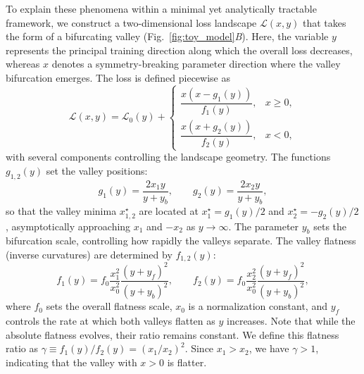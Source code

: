 \documentclass[aps,prx,reprint,superscriptaddress,longbibliography,nofootinbib,floatfix]{revtex4-2}
\begin{document}
To explain these phenomena within a minimal yet analytically tractable framework, we construct a two-dimensional loss landscape $\mathcal{L}(x, y)$ that takes the form of a bifurcating valley (Fig.~\ref{fig:toy_model}\textit{B}). Here, the variable $y$ represents the principal training direction along which the overall loss decreases, whereas $x$ denotes a symmetry-breaking parameter direction where the valley bifurcation emerges. The loss is defined piecewise as
\begin{equation}
    \mathcal{L}(x, y) = \mathcal{L}_0(y)  +
    \begin{cases}
       \dfrac{x(x - g_1(y))}{f_1(y)}, & x \geq 0, \\
       \dfrac{x(x + g_2(y))}{f_2(y)}, & x < 0,
    \end{cases}
    \label{eq:loss_toy_model}
\end{equation}
with several components controlling the landscape geometry. The functions $g_{1,2}(y)$ set the valley positions:
\begin{equation}
    g_1(y) = \frac{2 x_1 y}{y + y_b}, \qquad 
    g_2(y) = \frac{2 x_2 y}{y + y_b},
\end{equation}
so that the valley minima $x_{1,2}^{\star}$ are located at $x_1^{\star} = g_1(y)/2$ and $x_2^{\star} = -g_2(y)/2$, asymptotically approaching $x_1$ and $-x_2$ as $y \to \infty$. The parameter $y_b$ sets the bifurcation scale, controlling how rapidly the valleys separate. The valley flatness (inverse curvatures) are determined by $f_{1,2}(y)$:
\begin{equation}
    f_1(y) = f_0 \frac{x_1^2}{x_0^2} \frac{(y+y_f)^2}{(y+y_b)^2}, 
    \qquad 
    f_2(y) = f_0 \frac{x_2^2}{x_0^2} \frac{(y+y_f)^2}{(y+y_b)^2},
\end{equation}
where $f_0$ sets the overall flatness scale, $x_0$ is a normalization constant, and $y_f$ controls the rate at which both valleys flatten as $y$ increases. Note that while the absolute flatness evolves, their ratio remains constant. We define this flatness ratio as $\gamma \equiv f_1(y)/f_2(y) = (x_1/x_2)^2$. Since $x_1 > x_2$, we have $\gamma > 1$, indicating that the valley with $x>0$ is flatter.
\end{document}
